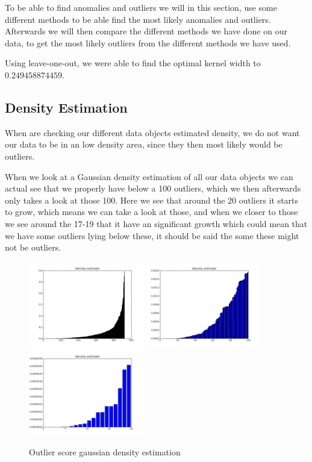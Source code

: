 \newpage
To be able to find anomalies and outliers we will in this section, use some different methods to be able find the most likely anomalies and outliers. Afterwards we will then compare the different methods we have done on our data, to get the most likely outliers from the different methods we have used.

Using leave-one-out, we were able to find the optimal kernel width to $0.249458874459$.

\subsection{Density Estimation}

When are checking our different data objects estimated density, we do not want our data to be in an low density area, since they then most likely would be outliers.

When we look at a Gaussian density estimation of all our data objects we can actual see that we properly have below a 100 outliers, which we then afterwards only takes a look at those 100. Here we see that around the 20 outliers it starts to grow, which means we can take a look at those, and when we closer to those we see around the 17-19 that it have an significant growth which could mean that we have some outliers lying below these, it should be said the some these might not be outliers.

\begin{figure}[H]
\centering
\includegraphics[width=5cm, keepaspectratio=true]{pictures/densityEstimationAll.png}
\includegraphics[width=5cm, keepaspectratio=true]{pictures/densityEstimation100.png}
\includegraphics[width=5cm, keepaspectratio=true]{pictures/densityEstimation20.png}
\vspace{-0.4cm}
\caption{\footnotesize Outlier score gaussian density estimation}
\label{gkd}
\end{figure}

